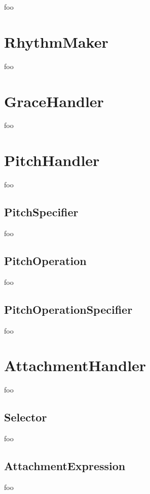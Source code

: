 foo

\section{RhythmMaker}

foo

\section{GraceHandler}

foo

\section{PitchHandler}

foo

\subsection{PitchSpecifier}

foo

\subsection{PitchOperation}

foo

\subsection{PitchOperationSpecifier}

foo

\section{AttachmentHandler}

foo

\subsection{Selector}

foo

\subsection{AttachmentExpression}

foo